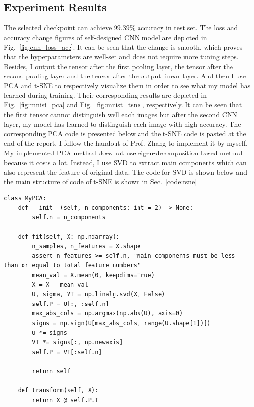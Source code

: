 \subsection{Experiment Results}
The selected checkpoint can achieve $99.39\%$ accuracy in test set. The loss and accuracy change figures of self-designed CNN model are depicted in Fig.~\ref{fig:cnn_loss_acc}. It can be seen that the change is smooth, which proves that the hyperparameters are well-set and does not require more tuning steps.
\newline
\newline
\noindent 
Besides, I output the tensor after the first pooling layer, the tensor after the second pooling layer and the tensor after the output linear layer. 
And then I use PCA and t-SNE to respectively visualize them in order to see what my model has learned during training.
Their corresponding results are depicted in Fig.~\ref{fig:mnist_pca} and Fig.~\ref{fig:mnist_tsne}, respectively.
It can be seen that the first tensor cannot distinguish well each images but after the second CNN layer, my model has learned to distinguish each image with high accuracy.
The corresponding PCA code is presented below and the t-SNE code is pasted at the end of the report. 
I follow the handout of Prof. Zhang to implement it by myself.
My implemented PCA method does not use eigen-decomposition based method because it costs a lot. 
Instead, I use SVD to extract main components which can also represent the feature of original data. 
The code for SVD is shown below and the main structure of code of t-SNE is shown in Sec.~\ref{code:tsne}
\begin{lstlisting}
class MyPCA:
    def __init__(self, n_components: int = 2) -> None:
        self.n = n_components
    
    def fit(self, X: np.ndarray):
        n_samples, n_features = X.shape
        assert n_features >= self.n, "Main components must be less than or equal to total feature numbers"
        mean_val = X.mean(0, keepdims=True)
        X = X - mean_val
        U, sigma, VT = np.linalg.svd(X, False)
        self.P = U[:, :self.n]
        max_abs_cols = np.argmax(np.abs(U), axis=0)
        signs = np.sign(U[max_abs_cols, range(U.shape[1])])
        U *= signs
        VT *= signs[:, np.newaxis]
        self.P = VT[:self.n]

        return self
    
    def transform(self, X):
        return X @ self.P.T
\end{lstlisting}
